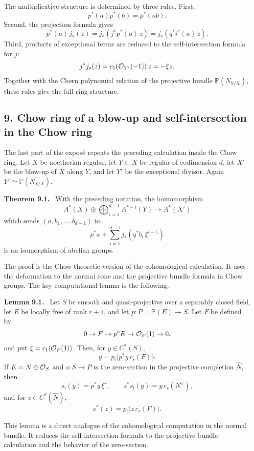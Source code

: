 \documentclass[11pt]{article}
\theoremstyle{plain}
\theoremstyle{definition}
\theoremstyle{remark}
\newenvironment{statement}[1]{\par\medskip\noindent\textbf{#1.}\ }{\par\medskip}
\begin{document}
The multiplicative structure is determined by three rules. First,
\[
   p^*(a)p^*(b)=p^*(ab).
\]
Second, the projection formula gives
\[
   p^*(a)\,j_*(z)=j_*(j^*p^*(a)\,z)=j_*(q^*i^*(a)\,z).
\]
Third, products of exceptional terms are reduced to the self-intersection formula for $j$:
\[
   j^*j_*(z)=c_1(\mathcal O_{Y'}(-1))\,z=-\xi z.
\]
Together with the Chern polynomial relation of the projective bundle $\mathbb P(N_{Y/X})$, these rules give the full ring structure.

\subsection*{9. Chow ring of a blow-up and self-intersection in the Chow ring}

The last part of the expos\'e repeats the preceding calculation inside the Chow ring. Let $X$ be noetherian regular, let $Y\subset X$ be regular of codimension $d$, let $X'$ be the blow-up of $X$ along $Y$, and let $Y'$ be the exceptional divisor. Again $Y'\simeq\mathbb P(N_{Y/X})$.

\begin{statement}{Theorem 9.1}
With the preceding notation, the homomorphism
\[
   A^*(X)\oplus \bigoplus_{i=1}^{d-1}A^{*-i}(Y)\longrightarrow A^*(X')
\]
which sends $(a,b_1,\ldots,b_{d-1})$ to
\[
   p^*a+\sum_{i=1}^{d-1}j_*(q^*b_i\,\xi^{i-1})
\]
is an isomorphism of abelian groups.
\end{statement}

The proof is the Chow-theoretic version of the cohomological calculation. It uses the deformation to the normal cone and the projective bundle formula in Chow groups. The key computational lemma is the following.

\begin{statement}{Lemma 9.1}
Let $S$ be smooth and quasi-projective over a separably closed field, let $E$ be locally free of rank $r+1$, and let $p:P=\mathbb P(E)\to S$. Let $F$ be defined by
\[
   0\to F\to p^*E\to\mathcal O_P(1)\to0,
\]
and put $\xi=c_1(\mathcal O_P(1))$. Then, for $y\in C^*(S)$,
\[
   y=p_!\bigl(p^*y\,c_r(F)\bigr).
\]
If $E=N\oplus\mathcal O_S$ and $s:S\to P$ is the zero-section in the projective completion $\widehat N$, then
\[
   s_!(y)=p^*y\,\xi^r,
   \qquad
   s^*s_!(y)=y\,c_r(N^\vee),
\]
and for $z\in C^*(\widehat N)$,
\[
   s^*(z)=p_!\bigl(z\,c_r(F)\bigr).
\]
\end{statement}

This lemma is a direct analogue of the cohomological computation in the normal bundle. It reduces the self-intersection formula to the projective bundle calculation and the behavior of the zero-section.
\end{document}
